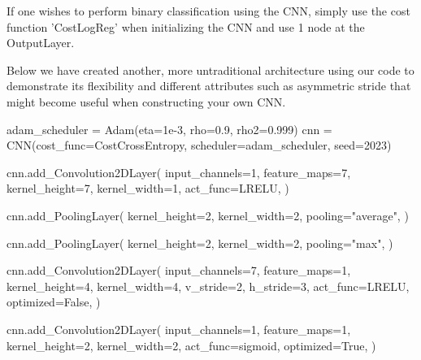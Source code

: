 \documentclass[%
oneside,                 %
final,                   %
10pt]{article}
\begin{document}
If one wishes to perform binary classification using the CNN, simply
use the cost function 'CostLogReg' when initializing the CNN and use 1
node at the OutputLayer.

Below we have created another, more untraditional architecture using
our code to demonstrate its flexibility and different attributes such
as asymmetric stride that might become useful when constructing your
own CNN.




























































\bpycod
adam_scheduler = Adam(eta=1e-3, rho=0.9, rho2=0.999)
cnn = CNN(cost_func=CostCrossEntropy, scheduler=adam_scheduler, seed=2023)

cnn.add_Convolution2DLayer(
    input_channels=1,
    feature_maps=7,
    kernel_height=7,
    kernel_width=1,
    act_func=LRELU,
)

cnn.add_PoolingLayer(
    kernel_height=2,
    kernel_width=2,
    pooling="average",
)

cnn.add_PoolingLayer(
    kernel_height=2,
    kernel_width=2,
    pooling="max",
)

cnn.add_Convolution2DLayer(
    input_channels=7,
    feature_maps=1,
    kernel_height=4,
    kernel_width=4,
    v_stride=2,
    h_stride=3,
    act_func=LRELU,
    optimized=False,
)

cnn.add_Convolution2DLayer(
    input_channels=1,
    feature_maps=1,
    kernel_height=2,
    kernel_width=2,
    act_func=sigmoid,
    optimized=True,
)
\end{document}
